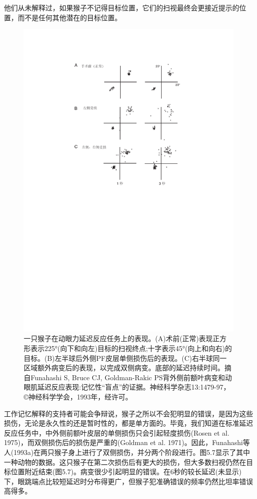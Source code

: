 他们从未解释过，如果猴子不记得目标位置，它们的扫视最终会更接近提示的位置，而不是任何其他潜在的目标位置。
\begin{figure}
	\centering
	\includegraphics[width=0.7\linewidth]{image_pfc/Fig_5_7}
	\caption{一只猴子在动眼力延迟反应任务上的表现。(A)术前(正常)表现正方形表示225°(向下和向左)目标的扫视终点;十字表示45°(向上和向右)的目标。(B)左半球后外侧PF皮层单侧损伤后的表现。(C)右半球同一区域额外病变后的表现，以完成双侧病变。底部的延迟持续时间。摘自Funahashi S, Bruce CJ, Goldman-Rakic PS背外侧前额叶病变和动眼肌延迟反应表现:记忆性“盲点”的证据。神经科学杂志13:1479-97，©神经科学学会，1993年，经许可。}
	\label{fig:fig}
\end{figure}

工作记忆解释的支持者可能会争辩说，猴子之所以不会犯明显的错误，是因为这些损伤，无论是永久性的还是暂时性的，都是单方面的。毕竟，我们知道在标准延迟反应任务中，中外侧前额叶皮层的单侧损伤只会引起轻度损伤(Rosen et al. 1975)，而双侧损伤后的损伤是严重的(Goldman et al. 1971)。因此，Funahashi等人(1993a)在两只猴子身上进行了双侧损伤，并分两个阶段进行。图5.7显示了其中一种动物的数据。这只猴子在第二次损伤后有更大的损伤，但大多数扫视仍然在目标位置附近结束(图5.7)。病变很少引起明显的错误。在6秒的较长延迟(未显示)下，眼跳端点比较短延迟时分布得更广，但猴子犯准确错误的频率仍然比坦率错误高得多。

